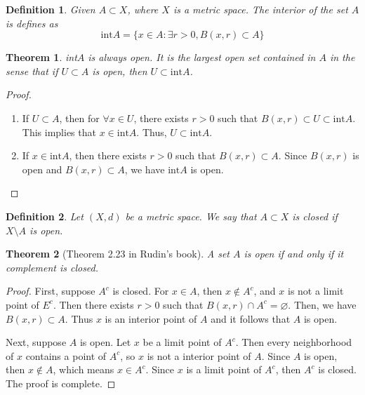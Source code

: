 \documentclass[12pt,leqno]{amsart}
\newtheorem{definition}{Definition}[section]
\newtheorem{theorem}{Theorem}[section]
\theoremstyle{definition}
\numberwithin{equation}{subsection}
\begin{document}
\medskip

\begin{definition}
Given $A\subset X$, where $X$ is a metric space. The interior of the set $A$ is defines as 
$$\text{int}A = \{x\in A: \exists r > 0, B(x,r)\subset A\}$$
\end{definition}

\medskip

\begin{theorem}
int$A$ is always open. It is the largest open set contained in $A$ in the sense that if $U\subset A$ is open, then $U \subset \text{int}A$.
\end{theorem}
\begin{proof}
~\begin{enumerate}
    \item If $U\subset A$, then for $\forall x\in U$, there exists $r>0$ such that $B(x,r)\subset U \subset \text{int}A$. This implies that $x\in \text{int}A$. Thus, $U\subset \text{int}A$.
    \item If $x\in \text{int}A$, then there exists $r>0$ such that $B(x,r)\subset A$. Since $B(x,r)$ is open and $B(x,r)\subset A$, we have $\text{int}A$ is open.
\end{enumerate}
\end{proof}

\begin{definition}
Let $(X,d)$ be a metric space. We say that $A\subset X$ is closed if $X\setminus A$ is open.
\end{definition}

\medskip

\begin{theorem}[Theorem 2.23 in Rudin's book]
A set $A$ is open if and only if it complement is closed.
\end{theorem}
\begin{proof}
First, suppose $A^c$ is closed. For $x\in A$, then $x\notin A^c$, and $x$ is not a limit point of $E^c$. Then there exists $r>0$ such that $B(x,r) \cap A^c = \varnothing$. Then, we have $B(x,r) \subset A$. Thus $x$ is an interior point of $A$ and it follows that $A$ is open.

Next, suppose $A$ is open. Let $x$ be a limit point of $A^c$. Then every neighborhood of $x$ contains a point of $A^c$, so $x$ is not a interior point of $A$. Since $A$ is open, then $x\notin A$, which means $x\in A^c$. Since $x$ is a limit point of $A^c$, then $A^c$ is closed. The proof is complete.
\end{proof}
\end{document}
